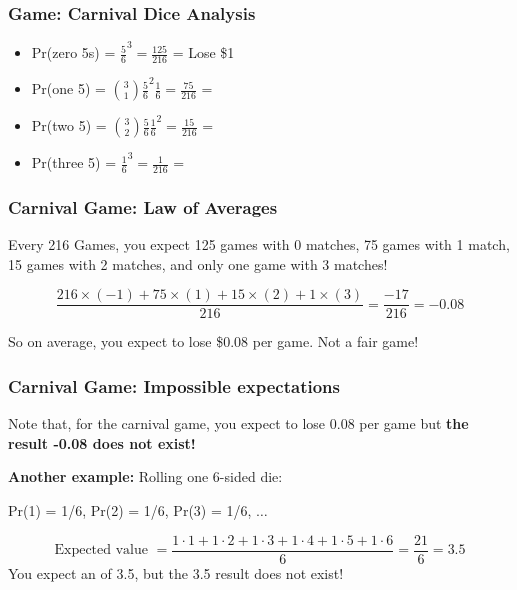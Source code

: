 \documentclass{beamer}
\begin{document}
\begin{frame}
  \frametitle{Game: Carnival Dice Analysis}

  {\larger
  \begin{itemize}
  \item Pr(zero 5s) = $\frac{5}{6}^3 = \frac{125}{216}$ = \alert{Lose \$1}
    \bigskip
    
  \item Pr(one 5) = $\binom{3}{1}\frac{5}{6}^2\frac{1}{6} =
    \frac{75}{216}$ = 
    \bigskip
    
  \item Pr(two 5) = $\binom{3}{2}\frac{5}{6}\frac{1}{6}^2 =
    \frac{15}{216}$ = 
    \bigskip
    
  \item Pr(three 5) = $\frac{1}{6}^3 = \frac{1}{216}$ = 
  \end{itemize}
  }
\end{frame}

\begin{frame}
  \frametitle{Carnival Game: Law of Averages}

  Every \alert{216 Games}, you expect \alert{125 games} with 0
  matches, \alert{75 games} with 1 match, \alert{15 games} with 2
  matches, and only \alert{one game} with 3 matches!

  \bigskip

  \begin{equation*}
    \frac{216\times(-1)+75\times(1)+15\times(2)+1\times(3)}{216} = \frac{-17}{216} = -0.08
  \end{equation*}

  \bigskip

  So on average, you expect to \alert{lose \$0.08} per game. Not a fair game!
\end{frame}

\begin{frame}
  \frametitle{Carnival Game: Impossible expectations}

  Note that, for the carnival game, you \alert{expect to lose 0.08 per
    game} but {\bf the result -0.08 does not exist!}

  \vfill

  {\bf Another example:} Rolling one 6-sided die:
  \bigskip

  Pr(1) = 1/6, Pr(2) = 1/6, Pr(3) = 1/6, $\ldots$
  \bigskip

  \begin{equation*}
    \text{Expected value } = \frac{1\cdot1 + 1\cdot2 + 1\cdot3 + 1\cdot4 + 1\cdot5 + 1\cdot6}{6} = \frac{21}{6} = 3.5 
  \end{equation*}
  You expect an  of 3.5, but the 3.5 result
  does not exist!
\end{frame}
\end{document}
